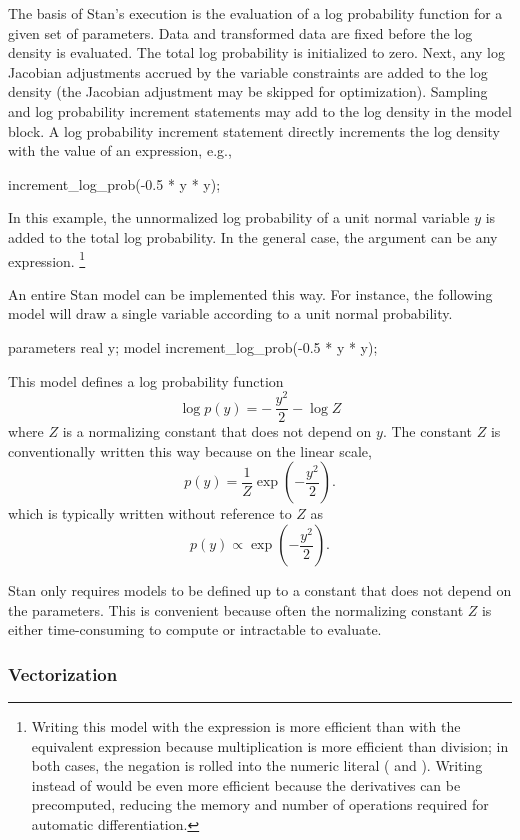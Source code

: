 The basis of Stan's execution is the evaluation of a log probability
function for a given set of parameters.  Data and transformed data are
fixed before the log density is evaluated.  The total log probability
is initialized to zero.  Next, any log Jacobian adjustments accrued by
the variable constraints are added to the log density (the Jacobian
adjustment may be skipped for optimization).  Sampling and log
probability increment statements may add to the log density in the
model block.  A log probability increment statement directly
increments the log density with the value of an expression, e.g.,
%
\begin{stancode}
increment_log_prob(-0.5 * y * y);
\end{stancode}
%
In this example, the unnormalized log probability of a unit normal
variable $y$ is added to the total log probability.  In the general
case, the argument can be any expression.%
%
\footnote{Writing this model with the expression 
  is more efficient than with the equivalent expression  because multiplication is more efficient than division; in
  both cases, the negation is rolled into the numeric literal
  ( and ).  Writing  instead of
   would be even more efficient because the derivatives
  can be precomputed, reducing the memory and number of operations
  required for automatic differentiation.}

An entire Stan model can be implemented this way.  For instance, the
following model will draw a single variable according to a unit normal
probability.
%
\begin{stancode}
parameters {
  real y;
}
model {
  increment_log_prob(-0.5 * y * y);
}
\end{stancode}
%
This model defines a log probability function
%
\[
\log p(y) = - \, \frac{y^2}{2} - \log Z
\]
%
where $Z$ is a normalizing constant that does not depend on $y$.  The
constant $Z$ is conventionally written this way because on the linear
scale,
\[
p(y) = \frac{1}{Z} \exp\left(-\frac{y^2}{2}\right).
\]
which is typically written without reference to $Z$ as
\[
p(y) \propto \exp\left(-\frac{y^2}{2}\right).
\]

Stan only requires models to be defined up to a constant that does not
depend on the parameters.  This is convenient because often the
normalizing constant $Z$ is either time-consuming to compute or
intractable to evaluate.

\subsubsection{Vectorization}


